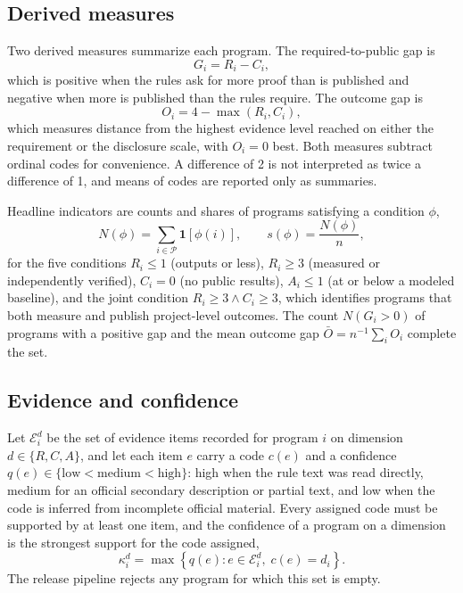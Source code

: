 \documentclass[10pt,twocolumn,letterpaper]{article}
\begin{document}
\subsection{Derived measures}

Two derived measures summarize each program. The required-to-public gap is
\begin{equation}
G_i = R_i - C_i ,
\label{eq:gap}
\end{equation}
which is positive when the rules ask for more proof than is published and negative when more is published than the rules require. The outcome gap is
\begin{equation}
O_i = 4 - \max(R_i, C_i),
\label{eq:og}
\end{equation}
which measures distance from the highest evidence level reached on either the requirement or the disclosure scale, with $O_i = 0$ best. Both measures subtract ordinal codes for convenience. A difference of 2 is not interpreted as twice a difference of 1, and means of codes are reported only as summaries.

Headline indicators are counts and shares of programs satisfying a condition $\phi$,
\begin{equation}
N(\phi) = \sum_{i \in \mathcal{P}} \mathbf{1}[\phi(i)], \qquad s(\phi) = \frac{N(\phi)}{n},
\label{eq:share}
\end{equation}
for the five conditions $R_i \le 1$ (outputs or less), $R_i \ge 3$ (measured or independently verified), $C_i = 0$ (no public results), $A_i \le 1$ (at or below a modeled baseline), and the joint condition $R_i \ge 3 \wedge C_i \ge 3$, which identifies programs that both measure and publish project-level outcomes. The count $N(G_i > 0)$ of programs with a positive gap and the mean outcome gap $\bar{O} = n^{-1}\sum_i O_i$ complete the set.

\subsection{Evidence and confidence}

Let $\mathcal{E}_i^d$ be the set of evidence items recorded for program $i$ on dimension $d \in \{R, C, A\}$, and let each item $e$ carry a code $c(e)$ and a confidence $q(e) \in \{\text{low} < \text{medium} < \text{high}\}$: high when the rule text was read directly, medium for an official secondary description or partial text, and low when the code is inferred from incomplete official material. Every assigned code must be supported by at least one item, and the confidence of a program on a dimension is the strongest support for the code assigned,
\begin{equation}
\kappa_i^d = \max \left\{ q(e) : e \in \mathcal{E}_i^d,\; c(e) = d_i \right\}.
\label{eq:conf}
\end{equation}
The release pipeline rejects any program for which this set is empty.
\end{document}
